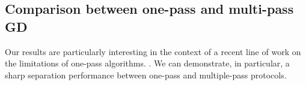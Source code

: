 \subsection{Comparison between one-pass and multi-pass GD}\label{2402:sec:com_multi_vs_once}


Our results are particularly interesting in the context of a recent line of work on the limitations of one-pass algorithms. 
\citep{arous2021online,abbe2021staircase,abbe2022merged,abbe2023sgd,dandi2023how,bietti2023learning,zweig2023symmetric}. We can demonstrate, in particular, a sharp separation performance between one-pass and multiple-pass protocols.

